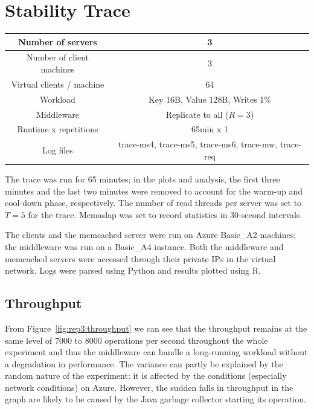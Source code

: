\documentclass[11pt]{article}
\begin{document}
\section{Stability Trace}\label{sec:trace}

\begin{center}
\small{
\smallskip
\begin{tabular}{|c|c|}
\hline Number of servers & 3 \\ 
\hline Number of client machines & 3 \\ 
\hline Virtual clients / machine &  64 \\ 
\hline Workload & Key 16B, Value 128B, Writes 1\% \\
\hline Middleware & Replicate to all ($R=3$) \\ 
\hline Runtime x repetitions & 65min x 1 \\ 
\hline Log files & trace-ms4, trace-ms5, trace-ms6, trace-mw, trace-req \\
\hline 
\end{tabular} }
\end{center}

The trace was run for 65 minutes; in the plots and analysis, the first three minutes and the last two minutes were removed to account for the warm-up and cool-down phase, respectively. The number of read threads per server was set to $T=5$ for the trace. Memaslap was set to record statistics in 30-second intervals.

The clients and the memcached server were run on Azure Basic\_A2 machines; the middleware was run on a Basic\_A4 instance. 
Both the middleware and memcached servers were accessed through their private IPs in the virtual network. Logs were parsed using Python and results plotted using R.



\subsection{Throughput}

From Figure~\ref{fig:rep3:throughput} we can see that the throughput remains at the same level of 7000 to 8000 operations per second throughout the whole experiment and thus the middleware can handle a long-running workload  without a degradation in performance. The variance can partly be explained by the random nature of the experiment: it is affected by the conditions (especially network conditions) on Azure. However, the sudden falls in throughput in the graph are likely to be caused by the Java garbage collector starting its operation.
\end{document}
